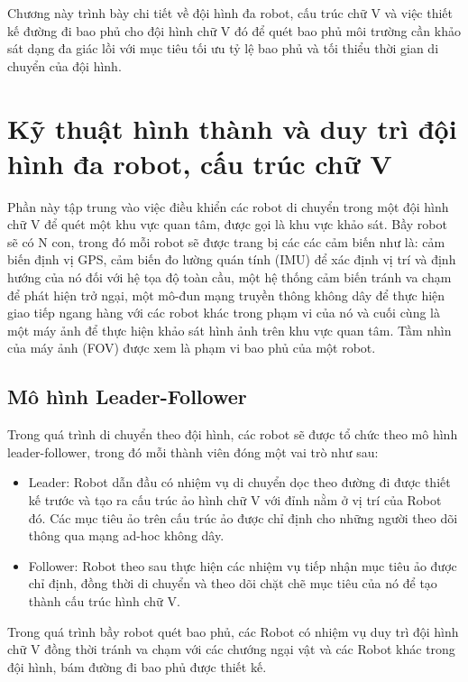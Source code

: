 Chương này trình bày chi tiết về đội hình đa robot, cấu trúc chữ V và việc thiết kế đường đi bao phủ cho đội hình chữ V đó để quét bao phủ môi trường cần khảo sát dạng đa giác lồi với mục tiêu tối ưu tỷ lệ bao phủ và tối thiểu thời gian di chuyển của đội hình.

\section{Kỹ thuật hình thành và duy trì đội hình đa robot, cấu trúc chữ V}
Phần này tập trung vào việc điều khiển các robot di chuyển trong một đội hình chữ V để quét một khu vực quan tâm, được gọi là khu vực khảo sát. Bầy robot sẽ có N con, trong đó mỗi robot sẽ được trang bị  các các cảm biến như là: cảm biến định vị GPS, cảm biến đo lường quán tính (IMU) để xác định vị trí và định hướng của nó đối với hệ tọa độ toàn cầu, một hệ thống cảm biến tránh va chạm để phát hiện trở ngại, một mô-đun mạng truyền thông không dây để thực hiện giao tiếp ngang hàng với các robot khác trong phạm vi của nó và cuối cùng là một máy ảnh để thực hiện khảo sát hình ảnh trên khu vực quan tâm. Tầm nhìn của máy ảnh (FOV) được xem là phạm vi bao phủ của một robot.

\subsection{Mô hình Leader-Follower}
Trong quá trình di chuyển theo đội hình, các robot sẽ được tổ chức theo mô hình leader-follower, trong đó mỗi thành viên đóng một vai trò như sau:
\begin{itemize}
    \item Leader: Robot dẫn đầu có nhiệm vụ di chuyển dọc theo đường đi được thiết kế trước và tạo ra cấu trúc ảo hình chữ V với đỉnh nằm ở vị trí của Robot đó. Các mục tiêu ảo trên cấu trúc ảo được chỉ định cho những người theo dõi thông qua mạng ad-hoc không dây.
        \item Follower: Robot theo sau thực hiện các nhiệm vụ tiếp nhận mục tiêu ảo được chỉ định, đồng thời di chuyển và theo dõi chặt chẽ mục tiêu của nó để tạo thành cấu trúc hình chữ V.
\end{itemize}

Trong quá trình bầy robot quét bao phủ, các Robot có nhiệm vụ duy trì đội hình chữ V đồng thời tránh va chạm với các chướng ngại vật và các Robot khác trong đội hình, bám đường đi bao phủ được thiết kế.

